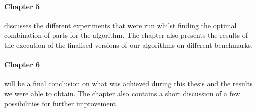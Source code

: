 \paragraph{Chapter 5}discusses the different experiments that were run whilst finding the optimal combination of parts for the algorithm. The chapter also presents the results of the execution of the finalised versions of our algorithms on different benchmarks.

\paragraph{Chapter 6}will be a final conclusion on what was achieved during this thesis and the results we were able to obtain. The chapter also contains a short discussion of a few possibilities for further improvement.









